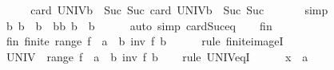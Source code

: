 \begin{isabellebody}
\ \ \isamarkupfalse%
\ \isamarkupfalse%
\ {\isachardoublequoteopen}card\ {\isacharquery}{\kern0pt}UNIV{\isacharunderscore}{\kern0pt}b\ {\isacharequal}{\kern0pt}\ Suc\ {\isacharparenleft}{\kern0pt}Suc\ {\isacharparenleft}{\kern0pt}card\ {\isacharquery}{\kern0pt}UNIV{\isacharunderscore}{\kern0pt}b\ {\isacharminus}{\kern0pt}\ Suc\ {\isacharparenleft}{\kern0pt}Suc\ {}{\isacharparenright}{\kern0pt}{\isacharparenright}{\kern0pt}{\isacharparenright}{\kern0pt}{\isachardoublequoteclose}\isanewline
\ \ \ \ \isamarkupfalse%
\ simp\isanewline
\ \ \isamarkupfalse%
\ \isamarkupfalse%
\ b{}\ b{}\ {\isacharcolon}{\kern0pt}{\isacharcolon}{\kern0pt}\ {\isacharprime}{\kern0pt}b\ \ b{}b{}{\isacharcolon}{\kern0pt}\ {\isachardoublequoteopen}b{}\ {\isasymnoteq}\ b{}{\isachardoublequoteclose}\isanewline
\ \ \ \ \isamarkupfalse%
\ {\isacharparenleft}{\kern0pt}auto\ simp{\isacharcolon}{\kern0pt}\ card{\isacharunderscore}{\kern0pt}Suc{\isacharunderscore}{\kern0pt}eq{\isacharparenright}{\kern0pt}\isanewline
\ \ \isamarkupfalse%
\ fin\ \isamarkupfalse%
\ fin{\isacharprime}{\kern0pt}{\isacharcolon}{\kern0pt}\ {\isachardoublequoteopen}finite\ {\isacharparenleft}{\kern0pt}range\ {\isacharparenleft}{\kern0pt}{\isasymlambda}f\ {\isacharcolon}{\kern0pt}{\isacharcolon}{\kern0pt}\ {\isacharprime}{\kern0pt}a\ {\isasymRightarrow}\ {\isacharprime}{\kern0pt}b{\isachardot}{\kern0pt}\ inv\ f\ b{}{\isacharparenright}{\kern0pt}{\isacharparenright}{\kern0pt}{\isachardoublequoteclose}\isanewline
\ \ \ \ \isamarkupfalse%
\ {\isacharparenleft}{\kern0pt}rule\ finite{\isacharunderscore}{\kern0pt}imageI{\isacharparenright}{\kern0pt}\isanewline
\ \ \isamarkupfalse%
\ {\isachardoublequoteopen}UNIV\ {\isacharequal}{\kern0pt}\ range\ {\isacharparenleft}{\kern0pt}{\isasymlambda}f\ {\isacharcolon}{\kern0pt}{\isacharcolon}{\kern0pt}\ {\isacharprime}{\kern0pt}a\ {\isasymRightarrow}\ {\isacharprime}{\kern0pt}b{\isachardot}{\kern0pt}\ inv\ f\ b{}{\isacharparenright}{\kern0pt}{\isachardoublequoteclose}\isanewline
\ \ \isamarkupfalse%
\ {\isacharparenleft}{\kern0pt}rule\ UNIV{\isacharunderscore}{\kern0pt}eq{\isacharunderscore}{\kern0pt}I{\isacharparenright}{\kern0pt}\isanewline
\ \ \ \ \isamarkupfalse%
\ x\ {\isacharcolon}{\kern0pt}{\isacharcolon}{\kern0pt}\ {\isacharprime}{\kern0pt}a\isanewline
\ \ \ \ \isamarkupfalse%

\end{isabellebody}
